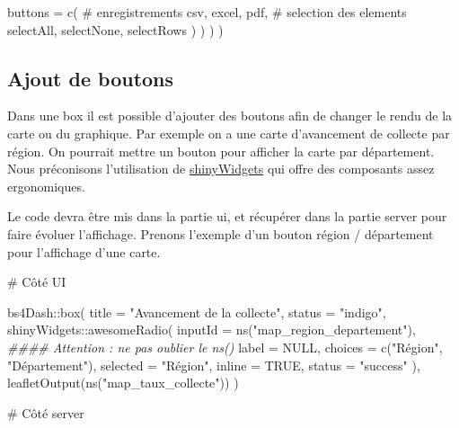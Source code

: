 \documentclass[
  letterpaper,
  DIV=11,
  numbers=noendperiod]{scrreprt}
\newenvironment{Shaded}{\begin{snugshade}}{\end{snugshade}}
\newcommand{\AttributeTok}[1]{\textcolor[rgb]{0.40,0.45,0.13}{#1}}
\newcommand{\CommentTok}[1]{\textcolor[rgb]{0.37,0.37,0.37}{#1}}
\newcommand{\ConstantTok}[1]{\textcolor[rgb]{0.56,0.35,0.01}{#1}}
\newcommand{\DocumentationTok}[1]{\textcolor[rgb]{0.37,0.37,0.37}{\textit{#1}}}
\newcommand{\FunctionTok}[1]{\textcolor[rgb]{0.28,0.35,0.67}{#1}}
\newcommand{\NormalTok}[1]{\textcolor[rgb]{0.00,0.23,0.31}{#1}}
\newcommand{\SpecialCharTok}[1]{\textcolor[rgb]{0.37,0.37,0.37}{#1}}
\newcommand{\StringTok}[1]{\textcolor[rgb]{0.13,0.47,0.30}{#1}}
\begin{document}
\begin{Shaded}
\begin{Highlighting}[]
                   \AttributeTok{buttons =} \FunctionTok{c}\NormalTok{(}
                     \CommentTok{\# enregistrements}
                      \StringTok{\textquotesingle{}csv\textquotesingle{}}\NormalTok{, }\StringTok{\textquotesingle{}excel\textquotesingle{}}\NormalTok{, }\StringTok{\textquotesingle{}pdf\textquotesingle{}}\NormalTok{,}
                     \CommentTok{\# selection des elements}
                     \StringTok{\textquotesingle{}selectAll\textquotesingle{}}\NormalTok{, }\StringTok{\textquotesingle{}selectNone\textquotesingle{}}\NormalTok{, }\StringTok{\textquotesingle{}selectRows\textquotesingle{}}
\NormalTok{                   )}
\NormalTok{                 )}
\NormalTok{                )}
\NormalTok{         )}
\end{Highlighting}
\end{Shaded}

\hypertarget{ajout-de-boutons}{%
\subsection{Ajout de boutons}\label{ajout-de-boutons}}

Dans une box il est possible d'ajouter des boutons afin de changer le
rendu de la carte ou du graphique. Par exemple on a une carte
d'avancement de collecte par région. On pourrait mettre un bouton pour
afficher la carte par département. Nous préconisons l'utilisation de
\href{https://shinyapps.dreamrs.fr/shinyWidgets/}{shinyWidgets} qui
offre des composants assez ergonomiques.

Le code devra être mis dans la partie ui, et récupérer dans la partie
server pour faire évoluer l'affichage. Prenons l'exemple d'un bouton
région / département pour l'affichage d'une carte.

\begin{Shaded}
\begin{Highlighting}[]
\CommentTok{\# Côté UI}

\NormalTok{      bs4Dash}\SpecialCharTok{::}\FunctionTok{box}\NormalTok{(}
          \AttributeTok{title =} \StringTok{"Avancement de la collecte"}\NormalTok{,}
          \AttributeTok{status =} \StringTok{"indigo"}\NormalTok{,}
\NormalTok{          shinyWidgets}\SpecialCharTok{::}\FunctionTok{awesomeRadio}\NormalTok{(}
            \AttributeTok{inputId =} \FunctionTok{ns}\NormalTok{(}\StringTok{"map\_region\_departement"}\NormalTok{), }\DocumentationTok{\#\#\#\# Attention : ne pas oublier le ns()}
            \AttributeTok{label =} \ConstantTok{NULL}\NormalTok{, }
            \AttributeTok{choices =} \FunctionTok{c}\NormalTok{(}\StringTok{"Région"}\NormalTok{, }\StringTok{"Département"}\NormalTok{),}
            \AttributeTok{selected =} \StringTok{"Région"}\NormalTok{,}
            \AttributeTok{inline =} \ConstantTok{TRUE}\NormalTok{,}
            \AttributeTok{status =} \StringTok{"success"}
\NormalTok{          ),}
          \FunctionTok{leafletOutput}\NormalTok{(}\FunctionTok{ns}\NormalTok{(}\StringTok{"map\_taux\_collecte"}\NormalTok{))}
\NormalTok{      )}

\CommentTok{\# Côté server}
\end{Highlighting}
\end{Shaded}
\end{document}

